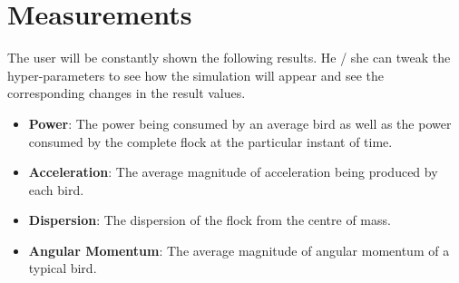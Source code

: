 \documentclass[a4paper,12pt,openany]{book}
\begin{document}
\section{Measurements}
The user will be constantly shown the following results. He / she can tweak the hyper-parameters to see how the simulation will appear and see the corresponding changes in the result values.
\begin{itemize}
\item \textbf{Power}: The power being consumed by an average bird as well as the power consumed by the complete flock at the particular instant of time.
\item \textbf{Acceleration}: The average magnitude of acceleration being produced by each bird.
\item \textbf{Dispersion}: The dispersion of the flock from the centre of mass.
\item \textbf{Angular Momentum}: The average magnitude of angular momentum of a typical bird.
\end{itemize}
\end{document}
